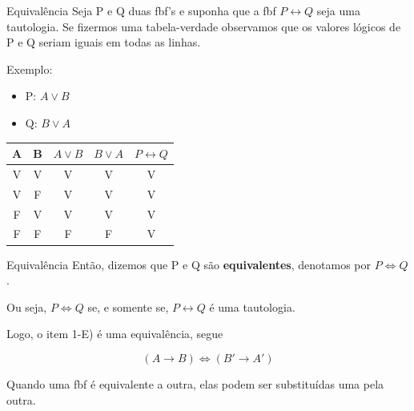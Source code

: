 \documentclass[aspectratio=169]{beamer}
\begin{document}
\begin{frame}{Equivalência}
    Seja P e Q duas fbf's e suponha que a fbf $P \leftrightarrow Q$ seja uma tautologia.
    Se fizermos uma tabela-verdade observamos que os valores lógicos de P e Q seriam iguais em todas as linhas.
    \vspace{5mm}

    Exemplo:
    \begin{itemize}
        \item P: $ A \vee B $
        \item Q: $ B \vee A $
    \end{itemize}

    \begin{table}[hb]
        \begin{tabular}{|c|c|c|c|c|}
            \hline
            \rowcolor{Asparagus}
            A & B & $ A \vee B $ & $ B \vee A $ & $ P \leftrightarrow Q $ \\
            \hline
            \hline
            \rowcolor{CambridgeBlue}
            V & V & V            & V            & V                       \\
            \hline
            \rowcolor{TeaGreen}
            V & F & V            & V            & V                       \\
            \hline
            \rowcolor{CambridgeBlue}
            F & V & V            & V            & V                       \\
            \hline
            \rowcolor{TeaGreen}
            F & F & F            & F            & V                       \\
            \hline
        \end{tabular}
    \end{table}

\end{frame}

\begin{frame}{Equivalência}
    Então, dizemos que P e Q são \textbf{equivalentes}, denotamos por $P \iff Q$.
    \vspace{5mm}

    Ou seja, $P \iff Q$ se, e somente se, $P \leftrightarrow Q$ é uma tautologia.
    \vspace{5mm}

    Logo, o item 1-E) é uma equivalência, segue

    \[(A \rightarrow B) \iff (B' \rightarrow A') \]

    \vspace{5mm}
    Quando uma fbf é equivalente a outra, elas podem ser substituídas uma pela outra.

\end{frame}
\end{document}
